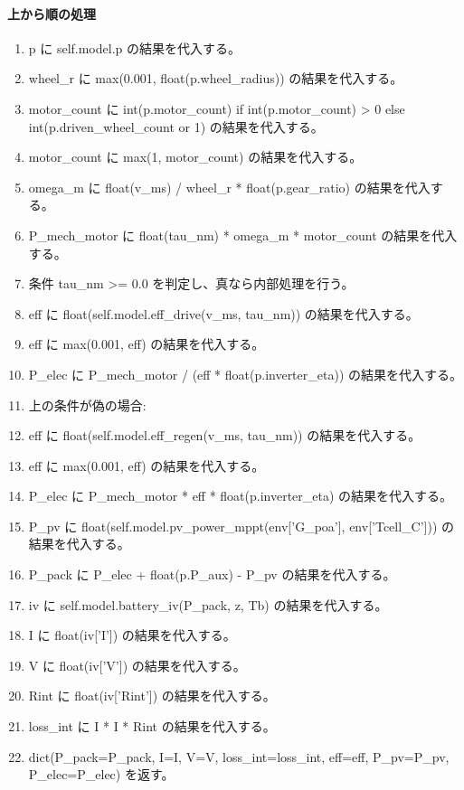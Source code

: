 \documentclass[a4paper,11pt]{article}
\begin{document}
            \paragraph{上から順の処理}
            \begin{enumerate}[leftmargin=1.8em]
            \item p に self.model.p の結果を代入する。
\item wheel\_r に max(0.001, float(p.wheel\_radius)) の結果を代入する。
\item motor\_count に int(p.motor\_count) if int(p.motor\_count) > 0 else int(p.driven\_wheel\_count or 1) の結果を代入する。
\item motor\_count に max(1, motor\_count) の結果を代入する。
\item omega\_m に float(v\_ms) / wheel\_r * float(p.gear\_ratio) の結果を代入する。
\item P\_mech\_motor に float(tau\_nm) * omega\_m * motor\_count の結果を代入する。
\item 条件 tau\_nm >= 0.0 を判定し、真なら内部処理を行う。
\item   eff に float(self.model.eff\_drive(v\_ms, tau\_nm)) の結果を代入する。
\item   eff に max(0.001, eff) の結果を代入する。
\item   P\_elec に P\_mech\_motor / (eff * float(p.inverter\_eta)) の結果を代入する。
\item   上の条件が偽の場合:
\item   eff に float(self.model.eff\_regen(v\_ms, tau\_nm)) の結果を代入する。
\item   eff に max(0.001, eff) の結果を代入する。
\item   P\_elec に P\_mech\_motor * eff * float(p.inverter\_eta) の結果を代入する。
\item P\_pv に float(self.model.pv\_power\_mppt(env['G\_poa'], env['Tcell\_C'])) の結果を代入する。
\item P\_pack に P\_elec + float(p.P\_aux) - P\_pv の結果を代入する。
\item iv に self.model.battery\_iv(P\_pack, z, Tb) の結果を代入する。
\item I に float(iv['I']) の結果を代入する。
\item V に float(iv['V']) の結果を代入する。
\item Rint に float(iv['Rint']) の結果を代入する。
\item loss\_int に I * I * Rint の結果を代入する。
\item dict(P\_pack=P\_pack, I=I, V=V, loss\_int=loss\_int, eff=eff, P\_pv=P\_pv, P\_elec=P\_elec) を返す。
            \end{enumerate}
\end{document}
